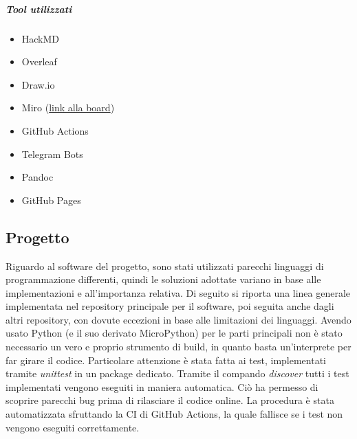         \subparagraph{Tool utilizzati}
        \begin{itemize}
            \item HackMD
            \item Overleaf
            \item Draw.io
            \item Miro (\href{https://miro.com/app/board/o9J_lEyTG7Q=/}{link alla board})
            \item GitHub Actions
            \item Telegram Bots
            \item Pandoc
            \item GitHub Pages
        \end{itemize}

    \subsection{Progetto}
        Riguardo al software del progetto, sono stati utilizzati parecchi linguaggi di programmazione differenti, quindi le soluzioni adottate variano in base alle implementazioni e all'importanza relativa. Di seguito si riporta una linea generale implementata nel repository principale per il software, poi seguita anche dagli altri repository, con dovute eccezioni in base alle limitazioni dei linguaggi.
        Avendo usato Python (e il suo derivato MicroPython) per le parti principali non è stato necessario un vero e proprio strumento di build, in quanto basta un'interprete per far girare il codice.
        Particolare attenzione è stata fatta ai test, implementati tramite \textit{unittest} in un package dedicato. Tramite il compando \textit{discover} tutti i test implementati vengono eseguiti in maniera automatica. Ciò ha permesso di scoprire parecchi bug prima di rilasciare il codice online. La procedura è stata automatizzata sfruttando la CI di GitHub Actions, la quale fallisce se i test non vengono eseguiti correttamente. 
        
